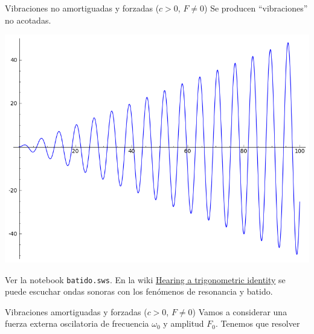 \documentclass[handout,hyperref={colorlinks=true}]{beamer}
\begin{document}
 \begin{frame}{ Vibraciones no amortiguadas y forzadas ($c>0$, $F\neq 0$) } 
Se producen ``vibraciones'' no acotadas.
\begin{center}
 \includegraphics[scale=0.3]{imagenes/osc_arm_forz_res.png}
\end{center}

Ver la notebook \texttt{batido.sws}. En la wiki \href{http://wiki.sagemath.org/interact/misc\#Hearing_a_trigonometric_identity}{Hearing a trigonometric identity}
se puede escuchar ondas sonoras con los fenómenos de resonancia y batido.

\end{frame}



\begin{frame}{ Vibraciones amortiguadas y forzadas ($c>0$, $F\neq 0$) }
Vamos a considerar una fuerza externa oscilatoria de frecuencia $\omega_0$ y amplitud $F_0$. Tenemos que resolver



\end{frame}



\end{document}
